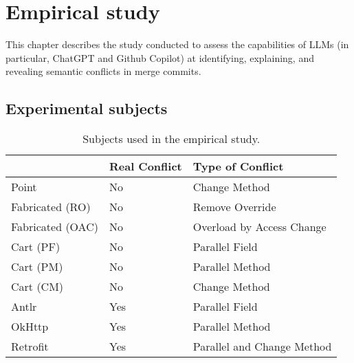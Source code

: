 \chapter{Empirical study}\label{chap:study}

This chapter describes the study conducted to assess the capabilities of LLMs
(in particular, ChatGPT and Github Copilot) at identifying, explaining,
and revealing semantic conflicts in merge commits.

\section{Experimental subjects}\label{chap:study:subjects}

\begin{table}[t]
\centering
\begin{tabular}{@{\extracolsep{\fill}} lll} \toprule
                 & Real Conflict & Type of Conflict \\
\midrule
Point            & No  & Change Method \\
Fabricated (RO)  & No  & Remove Override \\
Fabricated (OAC) & No  & Overload by Access Change \\
Cart (PF)        & No  & Parallel Field \\
Cart (PM)        & No  & Parallel Method \\
Cart (CM)        & No  & Change Method \\
Antlr            & Yes & Parallel Field \\
OkHttp           & Yes & Parallel Method \\
Retrofit         & Yes & Parallel and Change Method \\
\bottomrule
\end{tabular}
\caption{Subjects used in the empirical study.\label{tab:subjects}}
\end{table}


